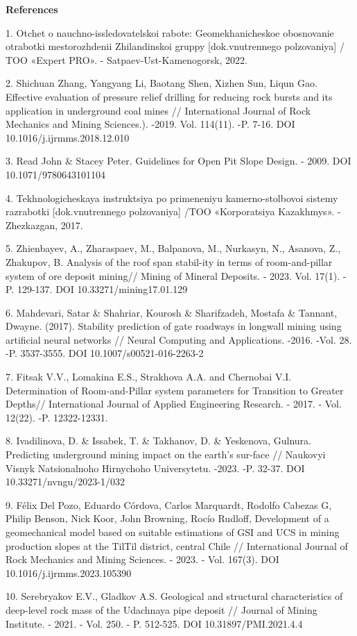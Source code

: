 \begin{center}
{\bfseries References}
\end{center}

\begin{noparindent}
1. Otchet o nauchno-issledovatel\textquotesingle skoi rabote:
Geomekhanicheskoe obosnovanie otrabotki mestorozhdenii Zhilandinskoi
gruppy {[}dok.vnutrennego pol\textquotesingle zovaniya{]} / TOO «Expert
PRO». - Satpaev-Ust\textquotesingle-Kamenogorsk, 2022.

2. Shichuan Zhang, Yangyang Li, Baotang Shen, Xizhen Sun, Liqun Gao.
Effective evaluation of pressure relief drilling for reducing rock
bursts and its application in underground coal mines // International
Journal of Rock Mechanics and Mining Sciences.). -2019. Vol. 114(11).
-P. 7-16. DOI 10.1016/j.ijrmms.2018.12.010

3. Read John \& Stacey Peter. Guidelines for Open Pit Slope Design. -
2009. DOI 10.1071/9780643101104

4. Tekhnologicheskaya instruktsiya po primeneniyu kamerno-stolbovoi
sistemy razrabotki {[}dok.vnutrennego pol\textquotesingle zovaniya{]}
/TOO «Korporatsiya Kazakhmys». - Zhezkazgan, 2017.

5. Zhienbayev, A., Zharaspaev, M., Balpanova, M., Nurkasyn, N., Asanova,
Z., Zhakupov, B. Analysis of the roof span stabil-ity in terms of
room-and-pillar system of ore deposit mining// Mining of Mineral
Deposits. - 2023. Vol. 17(1). - P. 129-137. DOI
10.33271/mining17.01.129

6. Mahdevari, Satar \& Shahriar, Kourosh \& Sharifzadeh, Mostafa \&
Tannant, Dwayne. (2017). Stability prediction of gate roadways in
longwall mining using artificial neural networks // Neural Computing and
Applications. -2016. -Vol. 28. -P. 3537-3555. DOI
10.1007/s00521-016-2263-2

7. Fitsak V.V., Lomakina E.S., Strakhova A.A. and Chernobai V.I.
Determination of Room-and-Pillar system parameters for Transition to
Greater Depths// International Journal of Applied Engineering Research.
- 2017. - Vol. 12(22). -P. 12322-12331.

8. Ivadilinova, D. \& Issabek, T. \& Takhanov, D. \& Yeskenova, Gulnura.
Predicting underground mining impact on the earth's sur-face // Naukovyi
Visnyk Natsionalnoho Hirnychoho Universytetu. -2023. -P. 32-37. DOI
10.33271/nvngu/2023-1/032

9. Félix Del Pozo, Eduardo Córdova, Carlos Marquardt, Rodolfo Cabezas G,
Philip Benson, Nick Koor, John Browning, Rocío Rudloff, Development of a
geomechanical model based on suitable estimations of GSI and UCS in
mining production slopes at the TilTil district, central Chile //
International Journal of Rock Mechanics and Mining Sciences. - 2023. -
Vol. 167(3). DOI 10.1016/j.ijrmms.2023.105390

10. Serebryakov E.V., Gladkov A.S. Geological and structural
characteristics of deep-level rock mass of the Udachnaya pipe deposit //
Journal of Mining Institute. - 2021. - Vol. 250. - P. 512-525. DOI
10.31897/PMI.2021.4.4
\end{noparindent}

